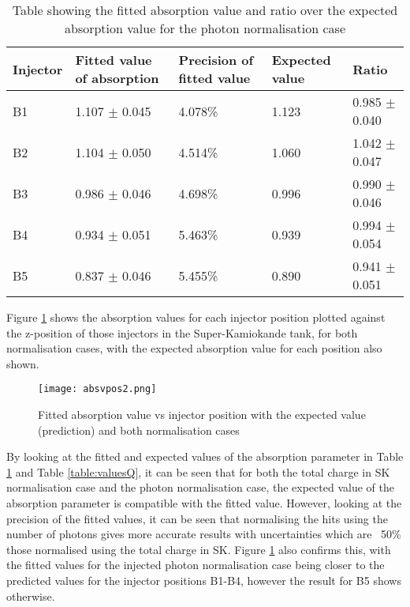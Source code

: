 \documentclass[11pt,oneside,a4paper]{article}
\begin{document}
\begin{table}[h]
	\begin{tabular}{lllll}
		Injector	&Fitted value of absorption & Precision of fitted value & Expected value & Ratio   \\
	\hline
		B1	  	&1.107 $\pm$ 0.045        & 4.078\%                 & 1.123           & 0.985 $\pm$ 0.040 \\
		B2		&1.104 $\pm$ 0.050        & 4.514\%                 & 1.060           & 1.042 $\pm$ 0.047  \\
		B3		&0.986 $\pm$ 0.046        & 4.698\%                 & 0.996           & 0.990 $\pm$ 0.046  \\
		B4		&0.934 $\pm$ 0.051        & 5.463\%                 & 0.939           & 0.994 $\pm$ 0.054  \\
		B5		&0.837 $\pm$ 0.046        & 5.455\%                 & 0.890           & 0.941 $\pm$ 0.051  \\           
	\end{tabular}
	\caption{Table \label{table:valuesPhoton} showing the fitted absorption value and ratio over the expected absorption value for the photon normalisation case}
\end{table}	
	
Figure \ref{fig:injposvsabs} shows the absorption values for each injector position plotted against the z-position of those injectors in the Super-Kamiokande tank, for both normalisation cases, with the expected absorption value for each position also shown. 	
	
\begin{figure}[htbp]
	\centering
	\texttt{[image: absvpos2.png]}
	\caption{Fitted absorption value vs injector position with the expected value (prediction) and both normalisation cases}
	\label{fig:injposvsabs}
\end{figure}	
	
By looking at the fitted and expected values of the absorption parameter in Table \ref{table:valuesPhoton} and Table \ref{table:valuesQ}, it can be seen that for both the total charge in SK normalisation case and the photon normalisation case, the expected value of the absorption parameter is compatible with the fitted value. However, looking at the precision of the fitted values, it can be seen that normalising the hits using the number of photons gives more accurate results with uncertainties which are ~50\% those normalised using the total charge in SK. Figure \ref{fig:injposvsabs} also confirms this, with the fitted values for the injected photon normalisation case being closer to the predicted values for the injector positions B1-B4, however the result for B5 shows otherwise. 
\newpage
\end{document}
